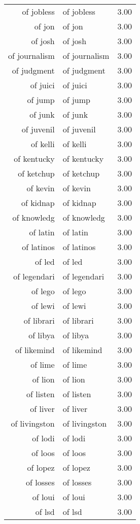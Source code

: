 \begin{table}[ht]
\begin{tabular}{rlr}
  of jobless & of jobless & 3.00 \\ 
  of jon & of jon & 3.00 \\ 
  of josh & of josh & 3.00 \\ 
  of journalism & of journalism & 3.00 \\ 
  of judgment & of judgment & 3.00 \\ 
  of juici & of juici & 3.00 \\ 
  of jump & of jump & 3.00 \\ 
  of junk & of junk & 3.00 \\ 
  of juvenil & of juvenil & 3.00 \\ 
  of kelli & of kelli & 3.00 \\ 
  of kentucky & of kentucky & 3.00 \\ 
  of ketchup & of ketchup & 3.00 \\ 
  of kevin & of kevin & 3.00 \\ 
  of kidnap & of kidnap & 3.00 \\ 
  of knowledg & of knowledg & 3.00 \\ 
  of latin & of latin & 3.00 \\ 
  of latinos & of latinos & 3.00 \\ 
  of led & of led & 3.00 \\ 
  of legendari & of legendari & 3.00 \\ 
  of lego & of lego & 3.00 \\ 
  of lewi & of lewi & 3.00 \\ 
  of librari & of librari & 3.00 \\ 
  of libya & of libya & 3.00 \\ 
  of likemind & of likemind & 3.00 \\ 
  of lime & of lime & 3.00 \\ 
  of lion & of lion & 3.00 \\ 
  of listen & of listen & 3.00 \\ 
  of liver & of liver & 3.00 \\ 
  of livingston & of livingston & 3.00 \\ 
  of lodi & of lodi & 3.00 \\ 
  of loos & of loos & 3.00 \\ 
  of lopez & of lopez & 3.00 \\ 
  of losses & of losses & 3.00 \\ 
  of loui & of loui & 3.00 \\ 
  of lsd & of lsd & 3.00 \\ 

\end{tabular}
\end{table}
